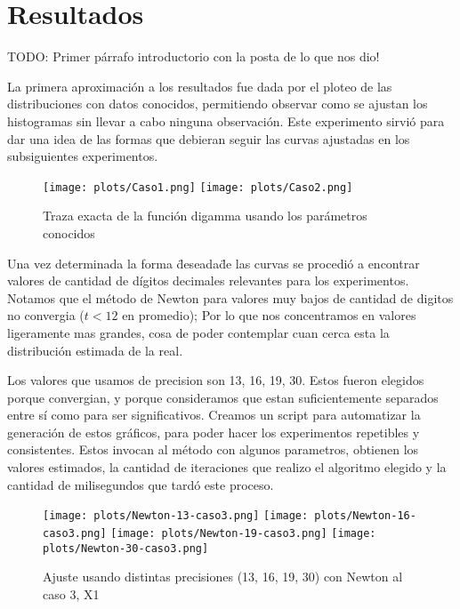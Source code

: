 \section{Resultados}

TODO: Primer p\'arrafo introductorio con la posta de lo que nos dio!

La primera aproximaci\'on a los resultados fue dada por el ploteo de las distribuciones con datos conocidos, permitiendo observar como se ajustan los histogramas sin llevar a cabo ninguna observaci\'on. Este experimento sirvi\'o para dar una idea de las formas que debieran seguir las curvas ajustadas en los subsiguientes experimentos.

\begin{figure} [H]
\begin {center}
\texttt{[image: plots/Caso1.png]}
\texttt{[image: plots/Caso2.png]}
\end {center}
\caption{Traza exacta de la funci\'on digamma usando los par\'ametros conocidos}
\label{fig:FitCaso3Newton}
\end{figure}

Una vez determinada la forma \"deseada\" de las curvas se procedi\'o a encontrar valores de cantidad de d\'igitos decimales relevantes para los experimentos. Notamos que el m\'etodo de Newton para valores muy bajos de cantidad de digitos no convergia ($t < 12$ en promedio); Por lo que nos concentramos en valores
ligeramente mas grandes, cosa de poder contemplar cuan cerca esta la distribuci\'on estimada de la real.

Los valores que usamos de precision son 13, 16, 19, 30. Estos fueron elegidos porque convergian, y porque consideramos que estan
suficientemente separados entre s\'i como para ser significativos. Creamos un script para automatizar la generaci\'on de estos gr\'aficos,
para poder hacer los experimentos repetibles y consistentes. Estos invocan al m\'etodo con algunos parametros, obtienen los
valores estimados, la cantidad de iteraciones que realizo el algoritmo elegido y la cantidad de milisegundos que tard\'o este proceso.


\begin{figure} [H]

\texttt{[image: plots/Newton-13-caso3.png]}
\texttt{[image: plots/Newton-16-caso3.png]}
\texttt{[image: plots/Newton-19-caso3.png]}
\texttt{[image: plots/Newton-30-caso3.png]}

\caption{Ajuste usando distintas precisiones (13, 16, 19, 30) con Newton al caso 3, X1}
\label{fig:FitCaso3Newton}
\end{figure}

